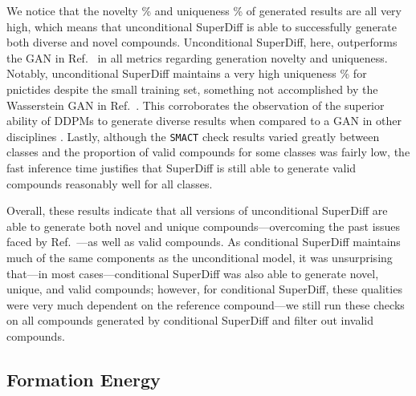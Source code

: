 \documentclass[%
reprint,
 amsmath,amssymb,
 aps,
prb,
]{revtex4-2}
\begin{document}
We notice that the novelty \% and uniqueness \% of generated results are all very high, which means that unconditional SuperDiff is able to successfully generate both diverse and novel compounds. Unconditional SuperDiff, here, outperforms the GAN in Ref.~\cite{Kim_2024} in all metrics regarding generation novelty and uniqueness. Notably, unconditional SuperDiff maintains a very high uniqueness \% for pnictides despite the small training set, something not accomplished by the Wasserstein GAN in Ref.~\cite{Kim_2024}. This corroborates the observation of the superior ability of DDPMs to generate diverse results when compared to a GAN in other disciplines \cite{dhariwal2021diffusion}. Lastly, although the \texttt{SMACT} check \cite{DAVIES2016617} results varied greatly between classes and the proportion of valid compounds for some classes was fairly low, the fast inference time justifies that SuperDiff is still able to generate valid compounds reasonably well for all classes. 



Overall, these results indicate that all versions of unconditional SuperDiff are able to generate both novel and unique compounds---overcoming the past issues faced by Ref.~\cite{Kim_2024}---as well as valid compounds. As conditional SuperDiff maintains much of the same components as the unconditional model, it was unsurprising that---in most cases---conditional SuperDiff was also able to generate novel, unique, and valid compounds; however, for conditional SuperDiff, these qualities were very much dependent on the reference compound---we still run these checks on all compounds generated by conditional SuperDiff and filter out invalid compounds.


\subsection{Formation Energy}
\label{sec:formationenergy}
\end{document}
